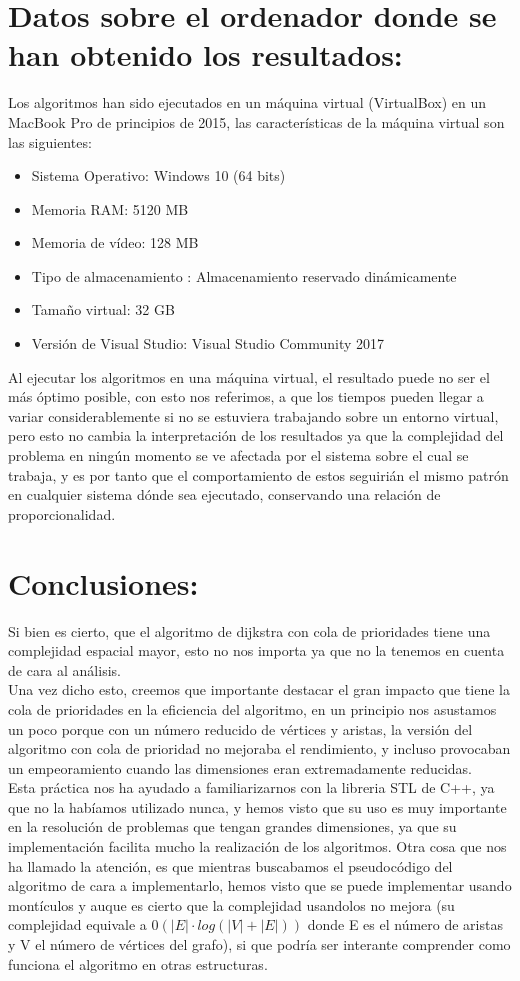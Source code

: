 \documentclass[a4paper]{llncs}
\begin{document}
\section{Datos sobre el ordenador donde se han obtenido los resultados:}
\medskip
Los algoritmos han sido ejecutados en un máquina virtual (VirtualBox) en un MacBook Pro de principios de 2015, las características de la máquina virtual son las siguientes:

\begin{itemize}
\item Sistema Operativo: Windows 10 (64 bits)
\item Memoria RAM: 5120 MB
\item Memoria de vídeo: 128 MB
\item Tipo de almacenamiento : Almacenamiento reservado dinámicamente
\item Tamaño virtual: 32 GB
\item Versión de Visual Studio: Visual Studio Community 2017
\end{itemize}

Al ejecutar los algoritmos en una máquina virtual, el resultado puede no ser el más óptimo posible, con esto nos referimos, a que los tiempos pueden llegar a variar considerablemente si no se estuviera trabajando sobre un entorno virtual, pero esto no cambia la interpretación de los resultados ya que la complejidad del problema en ningún momento se ve afectada por el sistema sobre el cual se trabaja, y es por tanto que el comportamiento de estos seguirián el mismo patrón en cualquier sistema dónde sea ejecutado, conservando una relación de proporcionalidad.

\section{Conclusiones: }

Si bien es cierto, que el algoritmo de dijkstra con cola de prioridades tiene una complejidad espacial mayor, esto no nos importa ya que no la tenemos en cuenta de cara al análisis.\\
Una vez dicho esto, creemos que importante destacar el gran impacto que tiene la cola de prioridades en la eficiencia del algoritmo, en un principio nos asustamos un poco porque con un número reducido de vértices y aristas, la versión del algoritmo con cola de prioridad no mejoraba el rendimiento, y incluso  provocaban un empeoramiento cuando las dimensiones eran extremadamente reducidas.\\
Esta práctica nos ha ayudado a familiarizarnos con la libreria STL de C++, ya que no la habíamos utilizado nunca, y hemos visto que su uso es muy importante en la resolución de problemas que tengan grandes dimensiones, ya que su implementación facilita mucho la realización de los algoritmos.
Otra cosa que nos ha llamado la atención, es que mientras buscabamos el pseudocódigo del algoritmo de cara a implementarlo,  hemos visto que se puede implementar usando montículos y auque es cierto que la complejidad usandolos no mejora (su complejidad equivale a $0(|E| \cdot log(|V|+|E|))$ donde E es el número de aristas y V el número de vértices del grafo), si que podría ser interante comprender como funciona el algoritmo en otras estructuras.
\end{document}
